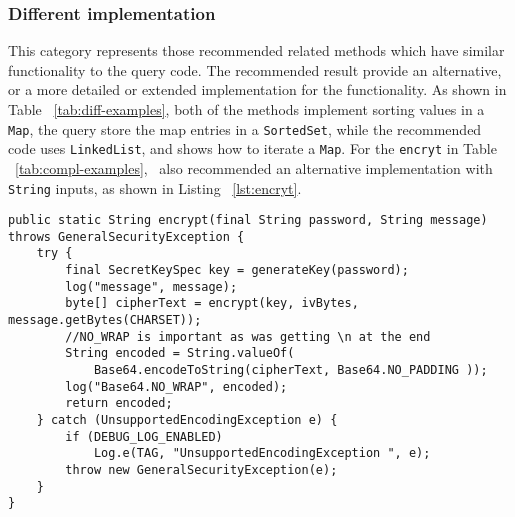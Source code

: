\subsubsection{Different implementation} This category represents those recommended related methods which have similar functionality to the query code. The recommended result provide an alternative, or a more detailed or extended implementation for the functionality. As shown in Table ~\ref{tab:diff-examples}, both of the methods implement sorting values in a \texttt{Map}, the query store the map entries in a \texttt{SortedSet}, while the recommended code uses \texttt{LinkedList}, and shows how to iterate a \texttt{Map}. For the \texttt{encryt} in Table ~\ref{tab:compl-examples}, \tool\ also recommended an alternative implementation with \texttt{String} inputs, as shown in Listing ~\ref{lst:encryt}.


\begin{lstlisting}[caption={different implementation for \texttt{encrypt}}, label={lst:encryt}]
public static String encrypt(final String password, String message) throws GeneralSecurityException {
	try {
		final SecretKeySpec key = generateKey(password);
		log("message", message);
		byte[] cipherText = encrypt(key, ivBytes, message.getBytes(CHARSET));
		//NO_WRAP is important as was getting \n at the end
		String encoded = String.valueOf(
			Base64.encodeToString(cipherText, Base64.NO_PADDING ));
		log("Base64.NO_WRAP", encoded);
		return encoded;
	} catch (UnsupportedEncodingException e) {
		if (DEBUG_LOG_ENABLED)
			Log.e(TAG, "UnsupportedEncodingException ", e);
		throw new GeneralSecurityException(e);
	}
}
\end{lstlisting}



